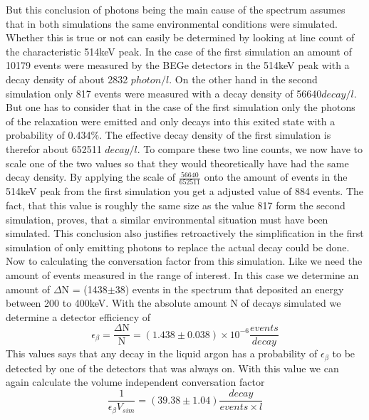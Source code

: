 But this conclusion of photons being the main cause of the spectrum assumes that in both simulations the same environmental conditions were simulated.
Whether this is true or not can easily be determined by looking at line count of the characteristic 514keV peak.
In the case of the first simulation an amount of 10179 events were measured by the BEGe detectors in the 514keV peak with a decay density of about 2832 $\unit{photon}/\unit{l}$.
On the other hand in the second simulation only 817 events were measured with a decay density of 56640$\unit{decay}/\unit{l}$.
But one has to consider that in the case of the first simulation only the photons of the  relaxation were emitted and \Kr only decays into this exited state with a probability of 0.434$\%$.
The effective decay density of the first simulation is therefor about 652511 $\unit{decay}/\unit{l}$.
To compare these two line counts, we now have to scale one of the two values so that they would theoretically have had the same decay density.
By applying the scale of $\frac{56640}{652511}$ onto the amount of events in the 514keV peak from the first simulation you get a adjusted value of 884 events.
The fact, that this value is roughly the same size as the value 817 form the second simulation, proves, that a similar environmental situation must have been simulated.
This conclusion also justifies retroactively the simplification in the first simulation of only emitting photons to replace the actual decay could be done.
\\

Now to calculating the conversation factor from this simulation.
Like we need the amount of events measured in the range of interest.
In this case we determine an amount of $\Delta$N = (1438$\pm$38) events in the spectrum that deposited an energy between 200 to 400keV.
With the absolute amount N of decays simulated we determine a detector efficiency of
\begin{equation*}
    \epsilon_{\beta} = \frac{\Delta \mathrm{N}}{\mathrm{N}} = (1.438\pm0.038)\times10^{-6} \frac{\unit{events}}{\unit{decay}}
\end{equation*}
This values says that any decay in the liquid argon has a probability of $\epsilon_{\beta}$ to be detected by one of the detectors that was always on.
With this value we can again calculate the volume independent conversation factor
\begin{equation*}
    \frac{1}{\epsilon_{\beta} V_{sim}} = (39.38\pm1.04) \frac{\unit{decay}}{\unit{events} \times l }
\end{equation*}
\\

